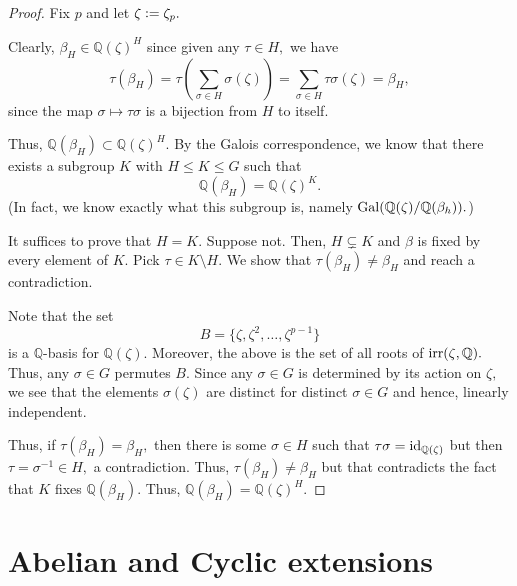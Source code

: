 \fixedfieldcyclosubgroup*\label{prop:fixedfieldcyclosubgroup2}
\begin{flushright}\hyperref[prop:fixedfieldcyclosubgroup]{\upsym}\end{flushright}
\begin{proof}
    Fix $p$ and let $\zeta \vcentcolon= \zeta_p.$

    Clearly, $\beta_H \in \mathbb{Q}(\zeta)^H$ since given any $\tau \in H,$ we have
    \begin{equation*} 
        \tau(\beta_H) = \tau\left(\sum_{\sigma \in H} \sigma(\zeta)\right) = \sum_{\sigma \in H} \tau\sigma(\zeta) = \beta_H,
    \end{equation*}
    since the map $\sigma \mapsto \tau\sigma$ is a bijection from $H$ to itself.

    Thus, $\mathbb{Q}(\beta_H) \subset \mathbb{Q}(\zeta)^H.$ By the Galois correspondence, we know that there exists a subgroup $K$ with $H \le K \le G$ such that
    \begin{equation*} 
        \mathbb{Q}(\beta_H) = \mathbb{Q}(\zeta)^K.
    \end{equation*}
    (In fact, we know exactly what this subgroup is, namely $\operatorname{Gal}(\mathbb{Q}(\zeta)/\mathbb{Q}(\beta_h)).$)

    It suffices to prove that $H = K.$ Suppose not. Then, $H \subsetneq K$ and $\beta$ is fixed by every element of $K.$ Pick $\tau \in K \setminus H.$ We show that $\tau(\beta_H) \neq \beta_H$ and reach a contradiction. 

    Note that the set
    \begin{equation*} 
        B = \{\zeta, \zeta^2, \ldots, \zeta^{p - 1}\}
    \end{equation*}
    is a $\mathbb{Q}$-basis for $\mathbb{Q}(\zeta).$ Moreover, the above is the set of all roots of $\operatorname{irr}(\zeta, \mathbb{Q}).$ Thus, any $\sigma \in G$ permutes $B.$ Since any $\sigma \in G$ is determined by its action on $\zeta,$ we see that the elements $\sigma(\zeta)$ are distinct for distinct $\sigma \in G$ and hence, linearly independent.

    Thus, if $\tau(\beta_H) = \beta_H,$ then there is some $\sigma \in H$ such that $\tau\sigma = \operatorname{id}_{\mathbb{Q}(\zeta)}$ but then $\tau = \sigma^{-1} \in H,$ a contradiction. Thus, $\tau(\beta_H) \neq \beta_H$ but that contradicts the fact that $K$ fixes $\mathbb{Q}(\beta_H).$ Thus, $\mathbb{Q}(\beta_H) = \mathbb{Q}(\zeta)^H.$
\end{proof}

\section{Abelian and Cyclic extensions}

